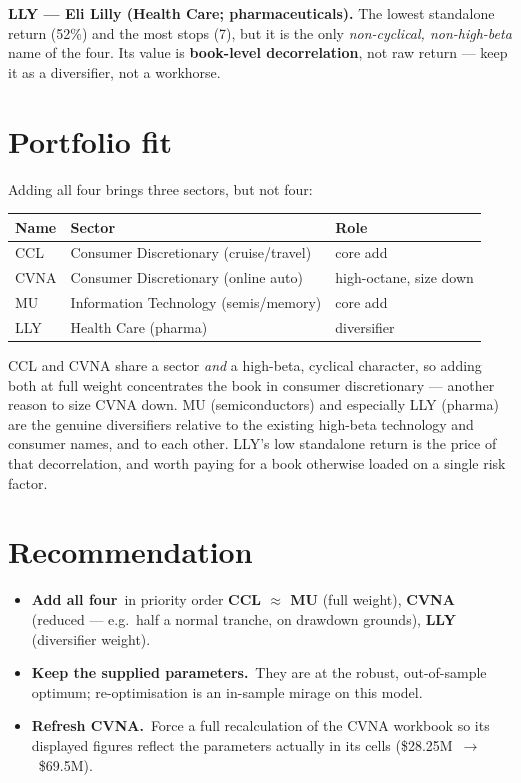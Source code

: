 \documentclass[11pt]{article}
\newcommand{\kpi}[2]{\textbf{#1}\,{\footnotesize\color{bcgrey}#2}}
\begin{document}
\textbf{LLY --- Eli Lilly (Health Care; pharmaceuticals).} The lowest standalone return (52\%)
and the most stops (7), but it is the only \emph{non-cyclical, non-high-beta} name of the four.
Its value is \textbf{book-level decorrelation}, not raw return --- keep it as a diversifier, not
a workhorse.

\section{Portfolio fit}

Adding all four brings three sectors, but not four:

\begin{table}[h]\centering\small
\renewcommand{\arraystretch}{1.15}
\begin{tabular}{l l l}
\toprule
\textbf{Name} & \textbf{Sector} & \textbf{Role}\\
\midrule
CCL  & Consumer Discretionary (cruise/travel)   & core add\\
CVNA & Consumer Discretionary (online auto)      & high-octane, size down\\
MU   & Information Technology (semis/memory)     & core add\\
LLY  & Health Care (pharma)                      & diversifier\\
\bottomrule
\end{tabular}
\end{table}

CCL and CVNA share a sector \emph{and} a high-beta, cyclical character, so adding both at full
weight concentrates the book in consumer discretionary --- another reason to size CVNA down. MU
(semiconductors) and especially LLY (pharma) are the genuine diversifiers relative to the
existing high-beta technology and consumer names, and to each other. LLY's low standalone return
is the price of that decorrelation, and worth paying for a book otherwise loaded on a single
risk factor.

\section{Recommendation}

\begin{itemize}[leftmargin=1.4em,itemsep=2pt]
  \item \kpi{Add all four}{} in priority order \textbf{CCL $\approx$ MU} (full weight),
        \textbf{CVNA} (reduced --- e.g.\ half a normal tranche, on drawdown grounds),
        \textbf{LLY} (diversifier weight).
  \item \kpi{Keep the supplied parameters.}{} They are at the robust, out-of-sample optimum;
        re-optimisation is an in-sample mirage on this model.
  \item \kpi{Refresh CVNA.}{} Force a full recalculation of the CVNA workbook so its displayed
        figures reflect the parameters actually in its cells (\$28.25M~$\to$~\$69.5M).
\end{itemize}
\end{document}
